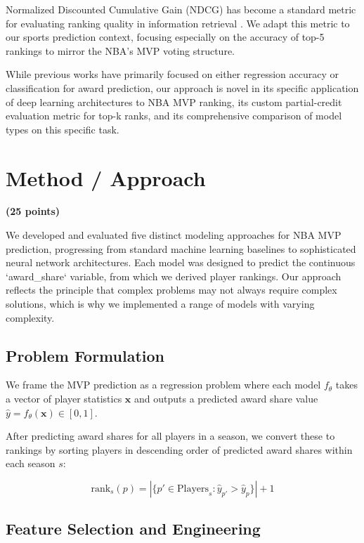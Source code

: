 \documentclass[10pt,twocolumn,letterpaper]{article}
\begin{document}
Normalized Discounted Cumulative Gain (NDCG) has become a standard metric for evaluating ranking quality in information retrieval \cite{jarvelin2002}. We adapt this metric to our sports prediction context, focusing especially on the accuracy of top-5 rankings to mirror the NBA's MVP voting structure.

While previous works have primarily focused on either regression accuracy or classification for award prediction, our approach is novel in its specific application of deep learning architectures to NBA MVP ranking, its custom partial-credit evaluation metric for top-k ranks, and its comprehensive comparison of model types on this specific task.

\section{Method / Approach}
\textbf{(25 points)}

We developed and evaluated five distinct modeling approaches for NBA MVP prediction, progressing from standard machine learning baselines to sophisticated neural network architectures. Each model was designed to predict the continuous `award_share` variable, from which we derived player rankings. Our approach reflects the principle that complex problems may not always require complex solutions, which is why we implemented a range of models with varying complexity.

\subsection{Problem Formulation}

We frame the MVP prediction as a regression problem where each model $f_\theta$ takes a vector of player statistics $\mathbf{x}$ and outputs a predicted award share value $\hat{y} = f_\theta(\mathbf{x}) \in [0,1]$.

After predicting award shares for all players in a season, we convert these to rankings by sorting players in descending order of predicted award shares within each season $s$:

\begin{equation}
\text{rank}_s(p) = |\{p' \in \text{Players}_s : \hat{y}_{p'} > \hat{y}_p\}| + 1
\end{equation}

\subsection{Feature Selection and Engineering}
\end{document}
